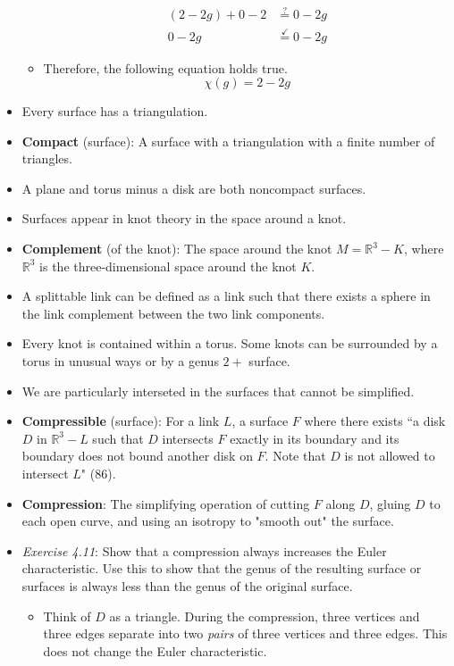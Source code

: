 \documentclass[titlepage]{article}
\numberwithin{figure}{section}
\numberwithin{table}{section}
\numberwithin{equation}{section}
\newcommand{\dq}[2]{``#1" (#2).}
\begin{document}
\begin{itemize}
\begin{itemize}
\begin{align*}
            (2-2g)+0-2 &\overset{?}{=} 0-2g\\
            0-2g &\overset{\checkmark}{=} 0-2g
        \end{align*}
        \item Therefore, the following equation holds true.
        \begin{equation}\label{eqn:chig}
            \chi(g)=2-2g
        \end{equation}
    \end{itemize}
    \item Every surface has a triangulation.
    \item \textbf{Compact} (surface): A surface with a triangulation with a finite number of triangles.
    \item A plane and torus minus a disk are both noncompact surfaces.
    \item Surfaces appear in knot theory in the space around a knot.
    \item \textbf{Complement} (of the knot): The space around the knot $M=\mathbb{R}^3-K$, where $\mathbb{R}^3$ is the three-dimensional space around the knot $K$.
    \item A splittable link can be defined as a link such that there exists a sphere in the link complement between the two link components.
    \item Every knot is contained within a torus. Some knots can be surrounded by a torus in unusual ways or by a genus $2+$ surface.
    \item We are particularly interseted in the surfaces that cannot be simplified.
    \item \textbf{Compressible} (surface): For a link $L$, a surface $F$ where there exists \dq{a disk $D$ in $\mathbb{R}^3-L$ such that $D$ intersects $F$ exactly in its boundary and its boundary does not bound another disk on $F$. Note that $D$ is not allowed to intersect $L$}{86}
    \item \textbf{Compression}: The simplifying operation of cutting $F$ along $D$, gluing $D$ to each open curve, and using an isotropy to "smooth out" the surface.
    \item \emph{Exercise 4.11}: Show that a compression always increases the Euler characteristic. Use this to show that the genus of the resulting surface or surfaces is always less than the genus of the original surface.
    \begin{itemize}
        \item Think of $D$ as a triangle. During the compression, three vertices and three edges separate into two \emph{pairs} of three vertices and three edges. This does not change the Euler characteristic.

\end{itemize}
\end{itemize}
\end{document}
